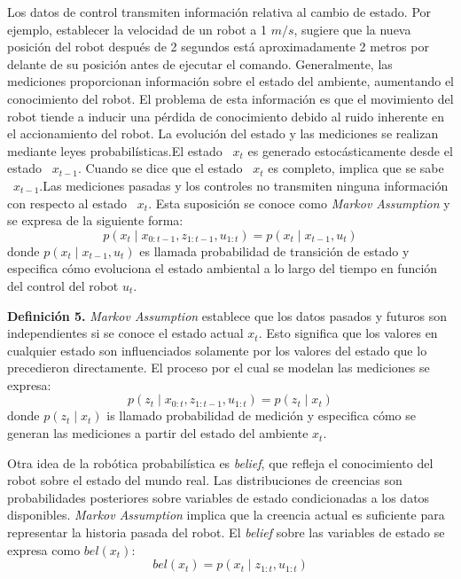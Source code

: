 Los datos de control transmiten información relativa al cambio de estado. Por ejemplo, establecer la velocidad de un robot a 1 $m/s$, sugiere que la nueva posición del robot después de 2 segundos está aproximadamente 2 metros por delante de su posición antes de ejecutar el comando.
Generalmente, las mediciones proporcionan información sobre el estado del ambiente, aumentando el conocimiento del robot. El problema de esta información es que el movimiento del robot tiende a inducir una pérdida de conocimiento debido al ruido inherente en el accionamiento del robot.
La evolución del estado y las mediciones se realizan mediante leyes probabilísticas.El estado ~$x_{t}$ es generado estocásticamente desde el estado ~$x_{t-1}$. Cuando se dice que el estado ~$x_{t}$ es completo, implica que se sabe ~$x_{t-1}$.Las mediciones pasadas y los controles no transmiten ninguna información con respecto al estado ~$x_{t}$. Esta suposición se conoce como \textit{Markov Assumption} y se expresa de la siguiente forma:
\begin{equation}
\label{eqn:markov-assumption1}
p(x_{t}\mid x_{0:t-1}, z_{1:t-1}, u_{1:t}) = p(x_{t}\mid x_{t-1}, u_{t})
\end{equation}
donde $p(x_{t}\mid x_{t-1}, u_{t})$ es llamada probabilidad de transición de estado y especifica cómo evoluciona el estado ambiental a lo largo del tiempo en función del control del robot $u_{t}$.  

\textbf{Definición 5.} \textit{Markov Assumption} establece que los datos pasados y futuros son independientes si se conoce el estado actual $x_{t}$. Esto significa que los valores en cualquier estado son influenciados solamente por los valores del estado que lo precedieron directamente.
El proceso por el cual se modelan las mediciones se expresa:
\begin{equation}
\label{eqn:markov-assumption2}
p(z_{t}\mid x_{0:t}, z_{1:t-1}, u_{1:t}) = p (z_{t}\mid x_{t})
\end{equation}
donde $p(z_{t}\mid x_{t})$ is llamado probabilidad de medición y especifica cómo se generan las mediciones a partir del estado del ambiente $x_{t}$.

Otra idea de la robótica probabilística es \textit{belief}, que refleja el conocimiento del robot sobre el estado del mundo real. Las distribuciones de creencias son probabilidades posteriores sobre variables de estado condicionadas a los datos disponibles. \textit{Markov Assumption} implica que la creencia actual es suficiente para representar la historia pasada del robot. El \textit{belief} sobre las variables de estado se expresa como $bel(x_{t})$:
\begin{equation}
bel(x_{t}) = p(x_{t}\mid z_{1:t}, u_{1:t})
\end{equation}

